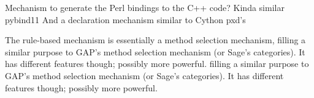 Mechanism to generate the Perl bindings to the C++ code? Kinda similar pybind11
And a declaration mechanism similar to Cython pxd's

The rule-based mechanism is essentially a method selection mechanism,
filling a similar purpose to GAP's method selection mechanism (or Sage's categories).
It has different features though; possibly more powerful.
filling a similar purpose to GAP's method selection mechanism (or Sage's categories).
It has different features though; possibly more powerful.
